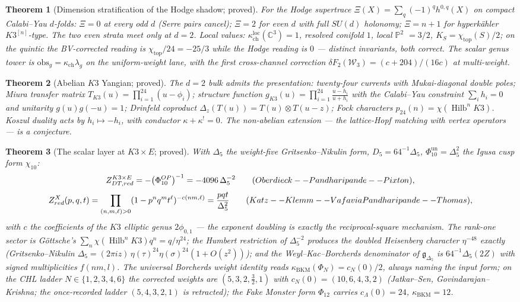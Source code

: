 \documentclass[11pt]{article}
\providecommand{\cW}{\mathcal{W}}
\providecommand{\bC}{\mathbb{C}}
\providecommand{\bP}{\mathbb{P}}
\providecommand{\fg}{\mathfrak{g}}
\providecommand{\kch}{\kappa_{\mathrm{ch}}}
\providecommand{\kBKM}{\kappa_{\mathrm{BKM}}}
\providecommand{\Dfive}{\Delta_5}
\providecommand{\Phiten}{\Phi_{10}}
\providecommand{\Hilb}{\operatorname{Hilb}}
\newtheorem{theorem}{Theorem}[section]
\begin{document}
\begin{theorem}[Dimension stratification of the Hodge shadow; proved]
\label{thm:cyd}
For the Hodge supertrace $\Xi(X)=\sum_q(-1)^qh^{0,q}(X)$ on compact
Calabi--Yau $d$-folds: $\Xi=0$ at every odd $d$ \textup{(Serre pairs
cancel)}; $\Xi=2$ for even $d$ with full $SU(d)$ holonomy; $\Xi=n+1$
for hyperk\"ahler $K3^{[n]}$-type. The two even strata meet only at
$d=2$. Local values: $\kch^{\mathrm{loc}}(\bC^3)=1$, resolved conifold
$1$, local $\bP^2$ $=3/2$, $K_S=\chi_{\mathrm{top}}(S)/2$; on the
quintic the BV-corrected reading is
$\chi_{\mathrm{top}}/24=-25/3$ while the Hodge reading is $0$ ---
distinct invariants, both correct. The scalar genus tower is
$\mathrm{obs}_g=\kch\lambda_g$ on the uniform-weight lane, with the
first cross-channel correction
$\delta F_2(\cW_3)=(c+204)/(16c)$ at multi-weight.
\end{theorem}

\begin{theorem}[Abelian $K3$ Yangian; proved]\label{thm:k3yangian}
The $d=2$ bulk admits the presentation: twenty-four currents with
Mukai-diagonal double poles; Miura transfer matrix
$T_{K3}(u)=\prod_{i=1}^{24}(u-\phi_i)$; structure function
$g_{K3}(u)=\prod_{i=1}^{24}\frac{u-h_i}{u+h_i}$ with the Calabi--Yau
constraint $\sum_ih_i=0$ and unitarity $g(u)g(-u)=1$; Drinfeld
coproduct $\Delta_z(T(u))=T(u)\otimes T(u-z)$; Fock characters
$p_{24}(n)=\chi(\Hilb^nK3)$. Koszul duality acts by $h_i\mapsto-h_i$,
with conductor $\kappa+\kappa^!=0$. The non-abelian extension --- the
lattice-Hopf matching with vertex operators --- is a conjecture.
\end{theorem}

\begin{theorem}[The scalar layer at $K3\times E$; proved]
\label{thm:scalar}
With $\Dfive$ the weight-five Gritsenko--Nikulin form,
$D_5=64^{-1}\Dfive$, $\Phiten^{\mathrm{un}}=\Dfive^2$ the Igusa cusp
form $\chi_{10}$:
\[
Z^{K3\times E}_{\mathrm{DT,red}}
=-\bigl(\Phiten^{\mathrm{OP}}\bigr)^{-1}
=-4096\,\Dfive^{-2}
\qquad\textup{(Oberdieck--Pandharipande--Pixton)},
\]
\[
Z^X_{\mathrm{red}}(p,q,t)
=\prod_{(n,m,\ell)>0}(1-p^nq^mt^\ell)^{-c(nm,\ell)}
=\frac{pqt}{\Dfive^2}
\qquad\textup{(Katz--Klemm--Vafa via Pandharipande--Thomas)},
\]
with $c$ the coefficients of the $K3$ elliptic genus $2\phi_{0,1}$ ---
the exponent doubling is exactly the reciprocal-square mechanism.
The rank-one sector is G\"ottsche's
$\sum_n\chi(\Hilb^nK3)q^n=q/\eta^{24}$; the Humbert restriction of
$\Dfive^{-2}$ produces the doubled Heisenberg character $\eta^{-48}$
exactly \textup{(Gritsenko--Nikulin
$\Dfive=(2\pi iz)\,\eta(\tau)^{24}\eta(\sigma)^{24}(1+O(z^2))$)};
and the Weyl--Kac--Borcherds denominator of $\fg_{\Dfive}$ is
$64^{-1}\Dfive(2Z)$ with signed multiplicities $f(nm,l)$. The
universal Borcherds weight identity reads
$\kBKM(\Phi_N)=c_N(0)/2$, always naming the input form; on the CHL
ladder $N\in\{1,2,3,4,6\}$ the corrected weights are
$(5,3,2,\tfrac32,1)$ with $c_N(0)=(10,6,4,3,2)$ \textup{(Jatkar--Sen,
Govindarajan--Krishna; the once-recorded ladder $(5,4,3,2,1)$ is
retracted)}; the Fake Monster form $\Phi_{12}$ carries
$c_\Lambda(0)=24$, $\kBKM=12$.
\end{theorem}
\end{document}
